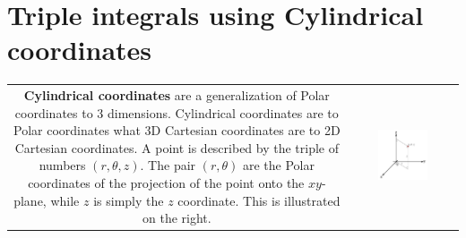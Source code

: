 \documentclass{article}
\begin{document}
\section*{Triple integrals using Cylindrical coordinates}

\begin{tabular}{cc}
\parbox{0.5\textwidth}{
{\bf Cylindrical coordinates} are a generalization of Polar coordinates to 3 dimensions. Cylindrical coordinates are to Polar coordinates what 3D Cartesian coordinates are to 2D Cartesian coordinates. A point is described by the triple of numbers \((r,\theta,z)\). The pair \((r, \theta)\) are the Polar coordinates of the projection of the point onto the \(xy\)-plane, while \(z\) is simply the \(z\) coordinate. This is illustrated on the right.
} & \parbox{0.5\textwidth}{
\includegraphics[width = 0.5\textwidth]{cylindrical_coordinates}
}
\end{tabular}
\end{document}
